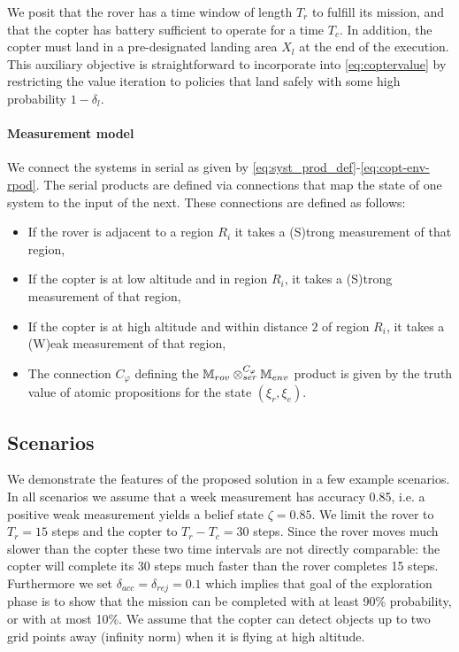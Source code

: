\documentclass[conference]{IEEEtran}
\begin{document}
We posit that the rover has a time window of length $T_r$ to fulfill its mission, and that the copter has battery sufficient to operate for a time $T_c$. In addition, the copter must land in a pre-designated landing area $X_l$ at the end of the execution. This auxiliary objective is straightforward to incorporate into \eqref{eq:coptervalue} by restricting the value iteration to policies that land safely with some high probability $1-\delta_l$.

\paragraph{Measurement model}

We connect the systems in serial as given by \eqref{eq:syst_prod_def}-\eqref{eq:copt-env-rpod}. The serial products are defined via connections that map the state of one system to the input of the next. These connections are defined as follows:
\begin{itemize}
  \item If the rover is adjacent to a region $R_i$ it takes a (S)trong measurement of that region,
  \item If the copter is at low altitude and in region $R_i$, it takes a (S)trong measurement of that region,
  \item If the copter is at high altitude and within distance $2$ of region $R_i$, it takes a (W)eak measurement of that region,
  \item The connection $C_\varphi$ defining the $\mathbb{M}_{rov} \otimes_{ser}^{C_\varphi} \mathbb{M}_{env}$ product is given by the truth value of atomic propositions for the state $(\xi_r, \xi_e)$.
\end{itemize}

\subsection{Scenarios}

We demonstrate the features of the proposed solution in a few example scenarios. In all scenarios we assume that a week measurement has accuracy 0.85, i.e. a positive weak measurement yields a belief state $\zeta=0.85$. We limit the rover to $T_r = 15$ steps and the copter to $T_r-T_c = 30$ steps. Since the rover moves much slower than the copter these two time intervals are not directly comparable: the copter will complete its 30 steps much faster than the rover completes 15 steps. Furthermore we set $\delta_{acc} = \delta_{rej} = 0.1$ which implies that goal of the exploration phase is to show that the mission can be completed with at least 90\% probability, or with at most 10\%. We assume that the copter can detect objects up to two grid points away (infinity norm) when it is flying at high altitude.
\end{document}
